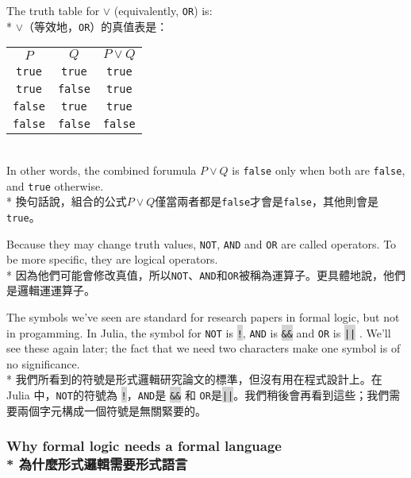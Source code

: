 \documentclass[]{article}
\newcommand{\codequote}[1]{\colorbox{lightgray}{\tt #1}}
\begin{document}
{\color{gray}The truth table for $ \lor $ (equivalently, {\tt OR}) is: }
\\*
{$ \lor $（等效地，{\tt OR}）的真值表是：}\\
\begin{tabular}{|c|c|c|}
	$ P $         & $ Q $           & $ P \lor Q $ \\
	{\tt true}  &  {\tt true}   & {\tt true}          \\
	{\tt true}  & {\tt false}	& {\tt true}       \\
	{\tt false} &  {\tt true}   & {\tt true}       \\
	{\tt false} & {\tt false}	& {\tt false}
\end{tabular} \\
{\color{gray}In other words, the combined forumula $ P\lor Q $ is {\tt false} only when both are {\tt false}, and {\tt true} otherwise.}
\\*
{換句話說，組合的公式$ P \lor Q $僅當兩者都是{\tt false}才會是{\tt false}，其他則會是{\tt true}。}

{\color{gray}Because they may change truth values, {\tt NOT}, {\tt AND} and {\tt OR} are called operators. To be more specific, they are logical operators.}
\\*
{因為他們可能會修改真值，所以{\tt NOT}、{\tt AND}和{\tt OR}被稱為運算子。更具體地說，他們是邏輯運運算子。}

{\color{gray}The symbols we've seen are standard for research papers in formal logic, but not in progamming. In Julia, the symbol for {\tt NOT} is \codequote{!}, {\tt AND} is \codequote{\&\&} and {\tt OR} is \codequote{||} . We'll see these again later; the fact that we need two characters make one symbol is of no significance.}
\\*
{我們所看到的符號是形式邏輯研究論文的標準，但沒有用在程式設計上。在 Julia 中，{\tt NOT}的符號為 \codequote{!}，{\tt AND}是 \codequote{\&\&} 和 {\tt OR}是\codequote{||}。我們稍後會再看到這些；我們需要兩個字元構成一個符號是無關緊要的。}

\subsubsection*{{\color{gray}Why formal logic needs a formal language}
\\*
{為什麼形式邏輯需要形式語言}}
\end{document}
